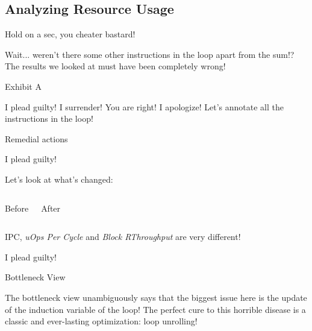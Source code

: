 
\subsection{Analyzing Resource Usage}


\begin{frame}{Hold on a sec, you cheater bastard!}
\begin{overprint}
Wait... weren't there \alert{some other instructions in the loop} apart from the sum!?
The results we looked at must have been completely wrong!
\end{overprint}
\begin{block}{Exhibit A}
\end{block}
\end{frame}


\begin{frame}{I plead guilty!}
I surrender! You are right! I apologize! Let's annotate all the instructions in the loop!
\begin{block}{Remedial actions}
\end{block}
\end{frame}


\begin{frame}{I plead guilty!}
\begin{center}
Let's look at what's changed:
%
\begin{columns}

\begin{block}{Before}
\end{block}

\begin{block}{After}
\end{block}

\end{columns}
\medskip
IPC, \emph{uOps Per Cycle} and \emph{Block RThroughput} are very different!\\
\end{center}
\end{frame}


\begin{frame}{I plead guilty!}
\begin{center}
\begin{block}{Bottleneck View}
\txtinput[\tt\fontsize{5.7pt}{6pt}\selectfont]{listings/01_add_reduction_v1b_p04.txt}
\end{block}
\medskip
\begin{overprint}
The bottleneck view unambiguously says that the biggest issue here is the update of the induction variable of the loop!
The perfect cure to this horrible disease is a classic and ever-lasting optimization: \alert{loop unrolling}!
\end{overprint}
\end{center}
\end{frame}


